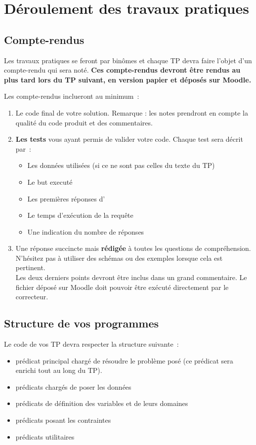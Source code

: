 \chapter*{Déroulement des travaux pratiques}

\section*{Compte-rendus}
Les travaux pratiques se feront par binômes et chaque TP devra faire
l'objet d'un compte-rendu qui sera noté.  {\bf Ces compte-rendus
  devront être rendus au plus tard lors du TP suivant, en version
  papier et déposés sur Moodle.}

Les compte-rendus  inclueront au minimum~:
\begin{enumerate}
\item Le code final de votre solution. Remarque : les notes prendront
  en compte la qualité du code produit et des commentaires.
 \item {\bf Les tests} vous ayant permis de
   valider votre code. Chaque test sera décrit par~:
\begin{itemize}
\item Les données utilisées (si ce ne sont pas celles du texte du TP)
\item Le but executé
\item Les premières réponses d'\eclipse
\item Le temps d'exécution de la requête
\item Une indication du nombre de réponses
\end{itemize}

\item Une réponse succincte mais \textbf{rédigée} à toutes les
  questions de compréhension. N'hésitez pas à utiliser des schémas ou
  des exemples
  lorsque cela est pertinent.\\

Les deux derniers points devront être inclus dans un grand
commentaire. Le fichier déposé sur Moodle doit pouvoir être exécuté
directement par le correcteur.
\end{enumerate}
 
\section*{Structure de vos programmes}
Le code de vos TP devra respecter la structure suivante~:
\begin{itemize}
 \item prédicat principal chargé de résoudre le problème posé (ce prédicat sera enrichi tout au long du TP).
 \item prédicats chargés de poser les données
 \item prédicats de définition des variables et de leurs domaines
 \item prédicats posant les contraintes 
 \item prédicats utilitaires
\end{itemize}

